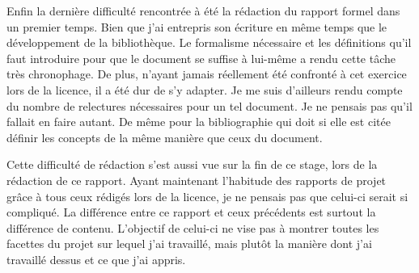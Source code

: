 Enfin la dernière difficulté rencontrée à été la rédaction du rapport formel 
dans un premier temps. Bien que j'ai entrepris son écriture en même temps que 
le développement de la bibliothèque. Le formalisme nécessaire et les définitions 
qu'il faut introduire pour que le document se suffise à lui-même a rendu cette 
tâche très chronophage. De plus, n'ayant jamais réellement été confronté à 
cet exercice lors de la licence, il a été dur de s'y adapter. Je me suis 
d'ailleurs rendu compte du nombre de relectures nécessaires pour un tel 
document. Je ne pensais pas qu'il fallait en faire autant. De même pour la 
bibliographie qui doit si elle est citée définir les concepts de la même manière 
que ceux du document.

Cette difficulté de rédaction s'est aussi vue sur la fin de ce stage, lors de la 
rédaction de ce rapport. Ayant maintenant l'habitude des rapports de projet 
grâce à tous ceux rédigés lors de la licence, je ne pensais pas que celui-ci 
serait si compliqué. La différence entre ce rapport et ceux précédents est 
surtout la différence de contenu. L'objectif de celui-ci ne vise pas à montrer 
toutes les facettes du projet sur lequel j'ai travaillé, mais plutôt la manière 
dont j'ai travaillé dessus et ce que j'ai appris. 

